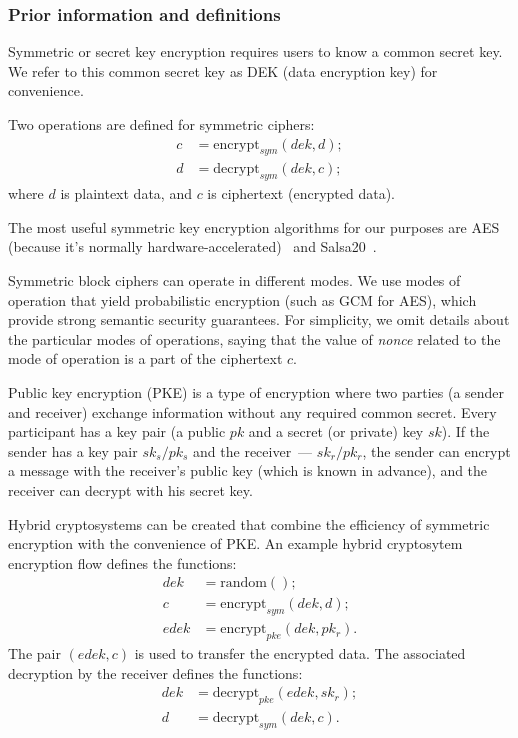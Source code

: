 \documentclass[notitlepage,longbibliography]{revtex4-1}
\begin{document}
\subsubsection{Prior information and definitions}

Symmetric or secret key encryption requires users to know a common secret key.
We refer to this common secret key as DEK (data encryption key) for convenience.

Two operations are defined for symmetric ciphers:
\begin{align}
    c &= \text{encrypt}_{sym}(dek, d);\\
    d &= \text{decrypt}_{sym}(dek, c);
\end{align}
where $d$ is plaintext data, and $c$ is ciphertext (encrypted data).

The most useful symmetric key encryption algorithms for our purposes are AES (because it's normally hardware-accelerated)~\cite{wiki:aes}
and Salsa20~\cite{wiki:salsa20}.

Symmetric block ciphers can operate in different modes.
We use modes of operation that yield probabilistic encryption (such as GCM for AES), which provide strong semantic security guarantees.
For simplicity, we omit details about the particular modes of operations, saying that the value of \emph{nonce} related to the mode of operation is a part of the
ciphertext $c$.

Public key encryption (PKE) is a type of encryption where two parties (a sender and receiver) exchange information without any required common secret.
Every participant has a key pair (a public $pk$ and a secret (or private) key $sk$).
If the sender has a key pair $sk_s/pk_s$ and the receiver~--- $sk_r/pk_r$, the sender can encrypt a message with the receiver's public key (which is known in advance),
and the receiver can decrypt with his secret key.

Hybrid cryptosystems can be created that combine the efficiency of symmetric encryption with the convenience of PKE.
An example hybrid cryptosytem encryption flow defines the functions:
\begin{align}
    dek &= \text{random}();\\
    c &= \text{encrypt}_{sym}(dek, d);\\
    edek &= \text{encrypt}_{pke}(dek, pk_r).
\end{align}
The pair $(edek, c)$ is used to transfer the encrypted data.
The associated decryption by the receiver defines the functions:
\begin{align}
    dek &= \text{decrypt}_{pke}(edek, sk_r);\\
    d &= \text{decrypt}_{sym}(dek, c).
\end{align}
\end{document}
